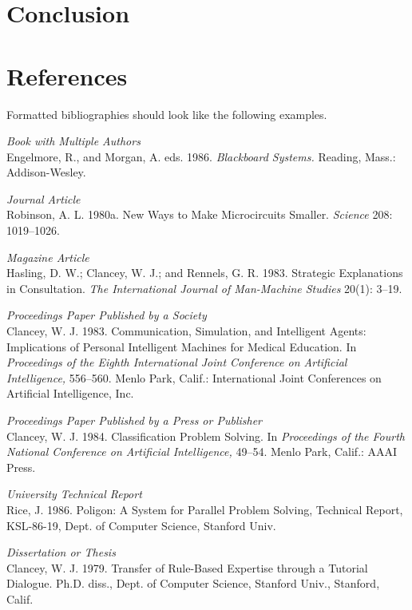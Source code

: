 \documentclass[letterpaper]{article} %
\begin{document}
\bigskip
\section{Conclusion}
\bigskip
\section{References} 
Formatted bibliographies should look like the following examples.

\smallskip \noindent \textit{Book with Multiple Authors}\\
Engelmore, R., and Morgan, A. eds. 1986. \textit{Blackboard Systems.} Reading, Mass.: Addison-Wesley.

\smallskip \noindent \textit{Journal Article}\\
Robinson, A. L. 1980a. New Ways to Make Microcircuits Smaller. \textit{Science} 208: 1019--1026.

\smallskip \noindent \textit{Magazine Article}\\
Hasling, D. W.; Clancey, W. J.; and Rennels, G. R. 1983. Strategic Explanations in Consultation. \textit{The International Journal of Man-Machine Studies} 20(1): 3--19.

\smallskip \noindent \textit{Proceedings Paper Published by a Society}\\
Clancey, W. J. 1983. Communication, Simulation, and Intelligent Agents: Implications of Personal Intelligent Machines for Medical Education. In \textit{Proceedings of the Eighth International Joint Conference on Artificial Intelligence,} 556--560. Menlo Park, Calif.: International Joint Conferences on Artificial Intelligence, Inc.

\smallskip \noindent \textit{Proceedings Paper Published by a Press or Publisher}\\
Clancey, W. J. 1984. Classification Problem Solving. In \textit{Proceedings of the Fourth National Conference on Artificial Intelligence,} 49--54. Menlo Park, Calif.: AAAI Press. 

\smallskip \noindent \textit{University Technical Report}\\
Rice, J. 1986. Poligon: A System for Parallel Problem Solving, Technical Report, KSL-86-19, Dept. of Computer Science, Stanford Univ. 

\smallskip \noindent \textit{Dissertation or Thesis}\\
Clancey, W. J. 1979. Transfer of Rule-Based Expertise through a Tutorial Dialogue. Ph.D. diss., Dept. of Computer Science, Stanford Univ., Stanford, Calif.
\end{document}
